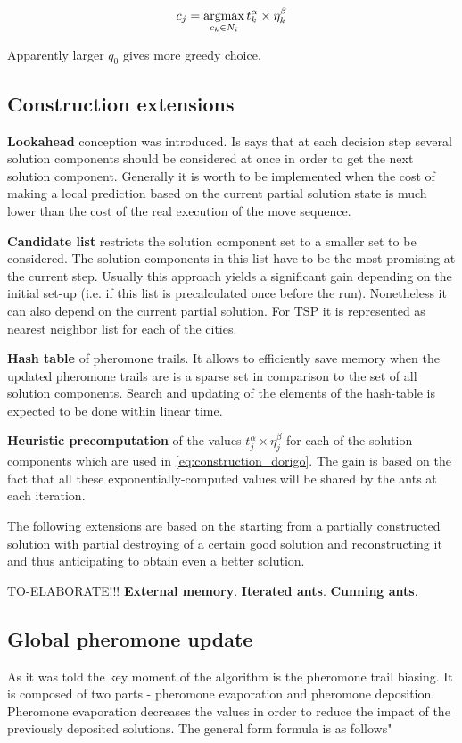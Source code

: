\documentclass[12pt]{article}
\begin{document}
\begin{equation}
c_j = \operatornamewithlimits{argmax}\limits_{c_k \in N_i} t_k^\alpha \times \eta_k^\beta
\label{eq:construction_dorigo}
\end{equation}

Apparently larger $q_0$ gives more greedy choice.

\subsection{Construction extensions}

\textbf{Lookahead} conception was introduced. Is says that at each decision step several solution components should be considered at once in order to get the next solution component. Generally it is worth to be implemented when the cost of making a local prediction based on the current partial solution state is much lower than the cost of the real execution of the move sequence.

\textbf{Candidate list} restricts the solution component set to a smaller set to be considered. The solution components in this list have to be the most promising at the current step. Usually this approach yields a significant gain depending on the initial set-up (i.e. if this list is precalculated once before the run). Nonetheless it can also depend on the current partial solution. For TSP it is represented as nearest neighbor list for each of the cities.

\textbf{Hash table} of pheromone trails. It allows to efficiently save memory when the updated pheromone trails are is a sparse set in comparison to the set of all solution components. Search and updating of the elements of the hash-table is expected to be done within linear time.

\textbf{Heuristic precomputation} of the values $t_j^\alpha \times \eta_j^\beta$ for each of the solution components which are used in \eqref{eq:construction_dorigo}. The gain is based on the fact that all these exponentially-computed values will be shared by the ants at each iteration.

The following extensions are based on the starting from a partially constructed solution with partial destroying of a certain good solution and reconstructing it and thus anticipating to obtain even a better solution.

TO-ELABORATE!!!
\textbf{External memory}.
\textbf{Iterated ants}.
\textbf{Cunning ants}.

\subsection{Global pheromone update}
As it was told the key moment of the algorithm is the pheromone trail biasing. It is composed of two parts - pheromone evaporation and pheromone deposition. Pheromone evaporation decreases the values in order to reduce the impact of the previously deposited solutions. The general form formula is as follows"
\end{document}
